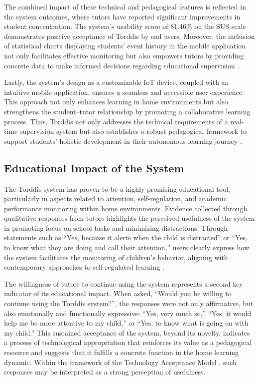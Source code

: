                 The combined impact of these technical and pedagogical features is reflected in the system outcomes, where tutors have reported significant improvements in student concentration. The system's usability score of 81.46\% on the SUS scale demonstrates positive acceptance of Torddis by end users. Moreover, the inclusion of statistical charts displaying students’ event history in the mobile application not only facilitates effective monitoring but also empowers tutors by providing concrete data to make informed decisions regarding educational supervision \citep{Wang2025Development}.
                
                Lastly, the system's design as a customizable IoT device, coupled with an intuitive mobile application, ensures a seamless and accessible user experience. This approach not only enhances learning in home environments but also strengthens the student–tutor relationship by promoting a collaborative learning process. Thus, Torddis not only addresses the technical requirements of a real-time supervision system but also establishes a robust pedagogical framework to support students’ holistic development in their autonomous learning journey \citep{Li2024Systematic}.
                
                \subsection{Educational Impact of the System}
                The Torddis system has proven to be a highly promising educational tool, particularly in aspects related to attention, self-regulation, and academic performance monitoring within home environments. Evidence collected through qualitative responses from tutors highlights the perceived usefulness of the system in promoting focus on school tasks and minimizing distractions. Through statements such as “Yes, because it alerts when the child is distracted” or “Yes, to know what they are doing and call their attention,” users clearly express how the system facilitates the monitoring of children's behavior, aligning with contemporary approaches to self-regulated learning \citep{Zimmerman2000Attaining}.
                
                The willingness of tutors to continue using the system represents a second key indicator of its educational impact. When asked, “Would you be willing to continue using the Torddis system?”, the responses were not only affirmative, but also emotionally and functionally expressive: “Yes, very much so,” “Yes, it would help me be more attentive to my child,” or “Yes, to know what is going on with my child.” This sustained acceptance of the system, beyond its novelty, indicates a process of technological appropriation that reinforces its value as a pedagogical resource and suggests that it fulfills a concrete function in the home learning dynamic. Within the framework of the Technology Acceptance Model \citep{Davis1989Management}, such responses may be interpreted as a strong perception of usefulness.
                
